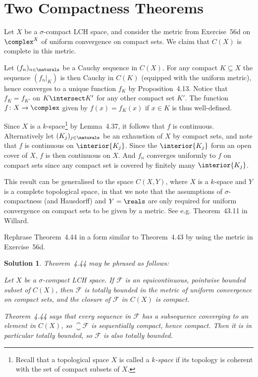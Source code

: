 \documentclass[article, a4paper, 11pt, oneside]{memoir}
\numberwithin{equation}{chapter}
\newcommand{\calF}{\mathcal{F}}
\newenvironment{displaytheorem}{%
	\begin{displayquote}\itshape%
}{%
	\end{displayquote}%
}
\theoremstyle{nonumberplain}
\newtheorem{solution}{Solution}
\begin{document}
\section{Two Compactness Theorems}

\begin{remarkbreak}
	Let $X$ be a $\sigma$-compact LCH space, and consider the metric from Exercise~56d on $\complex^X$ of uniform convergence on compact sets. We claim that $C(X)$ is complete in this metric.

	Let $(f_n)_{n\in\naturals}$ be a Cauchy sequence in $C(X)$. For any compact $K \subseteq X$ the sequence $(f_n|_K)$ is then Cauchy in $C(K)$ (equipped with the uniform metric), hence converges to a unique function $f_K$ by Proposition~4.13. Notice that $f_K = f_{K'}$ on $K \intersect K'$ for any other compact set $K'$. The function $f \colon X \to \complex$ given by $f(x) = f_K(x)$ if $x \in K$ is thus well-defined.

	Since $X$ is a $k$-space\footnote{Recall that a topological space $X$ is called a \emph{$k$-space} if its topology is coherent with the set of compact subsets of $X$.} by Lemma~4.37, it follows that $f$ is continuous. Alternatively let $(K_j)_{j\in\naturals}$ be an exhaustion of $X$ by compact sets, and note that $f$ is continuous on $\interior{K_j}$. Since the $\interior{K_j}$ form an open cover of $X$, $f$ is then continuous on $X$. And $f_n$ converges uniformly to $f$ on compact sets since any compact set is covered by finitely many $\interior{K_j}$.

	This result can be generalised to the space $C(X,Y)$, where $X$ is a $k$-space and $Y$ is a complete topological space, in that we note that the assumptions of $\sigma$-compactness (and Hausdorff) and $Y = \reals$ are only required for uniform convergence on compact sets to be given by a metric. See e.g. Theorem~43.11 in Willard.
\end{remarkbreak}


\begin{exerciseframed*}[62]
	Rephrase Theorem~4.44 in a form similar to Theorem~4.43 by using the metric in Exercise~56d.
\end{exerciseframed*}

\begin{solution}
	Theorem~4.44 may be phrased as follows:
	\begin{displaytheorem}
		Let $X$ be a $\sigma$-compact LCH space. If $\calF$ is an equicontinuous, pointwise bounded subset of $C(X)$, then $\calF$ is totally bounded in the metric of uniform convergence on compact sets, and the closure of $\calF$ in $C(X)$ is compact.
	\end{displaytheorem}
	Theorem~4.44 says that every sequence in $\calF$ has a subsequence converging to an element in $C(X)$, so $\closure{\calF}$ is sequentially compact, hence compact. Then it is in particular totally bounded, so $\calF$ is also totally bounded.
\end{solution}
\end{document}
